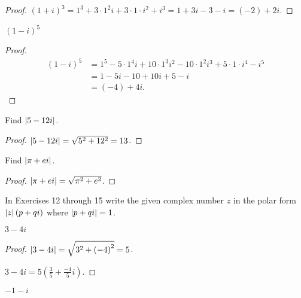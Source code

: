 \begin{proof}
    ${(1+i)}^{3} = 1^{3} + 3\cdot 1^{2}i + 3\cdot 1\cdot i^{2} + i^{3} = 1 + 3i - 3 - i = (-2) + 2i$.
\end{proof}

\begin{exercise}
    ${(1-i)}^{5}$
\end{exercise}

\begin{proof}
    \begin{align*}
        {(1-i)}^{5} & = 1^{5} - 5\cdot 1^{4}i + 10\cdot 1^{3}i^{2} - 10\cdot 1^{2}i^{3} + 5\cdot 1\cdot i^{4} - i^{5} \\
                    & = 1 - 5i - 10 + 10i + 5 - i                                                                     \\
                    & = (-4) + 4i.
    \end{align*}
\end{proof}

\begin{exercise}
    Find $\left\vert{5 - 12i}\right\vert$.
\end{exercise}

\begin{proof}
    $\left\vert{5 - 12i}\right\vert = \sqrt{5^{2} + 12^{2}} = 13$.
\end{proof}

\begin{exercise}
    Find $\left\vert{\pi + ei}\right\vert$.
\end{exercise}

\begin{proof}
    $\left\vert{\pi + ei}\right\vert = \sqrt{\pi^{2} + e^{2}}$.
\end{proof}

In Exercises 12 through 15 write the given complex number $z$ in the polar form $\left\vert{z}\right\vert(p + qi)$ where $\left\vert{p + qi}\right\vert = 1$.

\begin{exercise}
    $3 - 4i$
\end{exercise}

\begin{proof}
    $\left\vert{3 - 4i}\right\vert = \sqrt{3^{2} + {(-4)}^{2}} = 5$.

    $3 - 4i = 5\left(\frac{3}{5} + \frac{-4}{5}i\right)$.
\end{proof}

\begin{exercise}
    $-1 - i$
\end{exercise}

